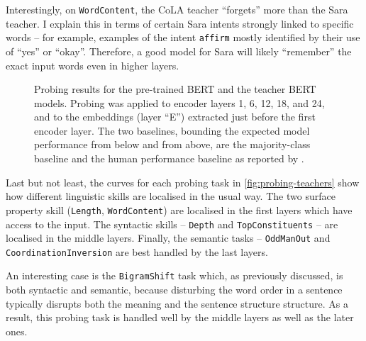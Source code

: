 \documentclass[bsc,frontabs,twoside,singlespacing,parskip,deptreport]{infthesis}
\begin{document}
{{{      Interestingly, on \verb|WordContent|, the CoLA teacher ``forgets'' more than the Sara teacher. I explain this in terms of certain Sara intents strongly linked to specific words -- for example, examples of the intent \verb|affirm| mostly identified by their use of ``yes'' or ``okay''. Therefore, a good model for Sara will likely ``remember'' the exact input words even in higher layers.

      \begin{figure}[h!tb]
        \centering
        \caption{Probing results for the pre-trained BERT and the teacher BERT models. Probing was applied to encoder layers 1, 6, 12, 18, and 24, and to the embeddings (layer ``E'') extracted just before the first encoder layer. The two baselines, bounding the expected model performance from below and from above, are the majority-class baseline and the human performance baseline as reported by \citet{Conneau_2018}.}
        \label{fig:probing-teachers}
      \end{figure}

      Last but not least, the curves for each probing task in \autoref{fig:probing-teachers} show how different linguistic skills are localised in the usual way. The two surface property skill (\verb|Length|, \verb|WordContent|) are localised in the first layers which have access to the input. The syntactic skills -- \verb|Depth| and \verb|TopConstituents| -- are localised in the middle layers. Finally, the semantic tasks -- \verb|OddManOut| and \verb|CoordinationInversion| are best handled by the last layers.
      
      An interesting case is the \verb|BigramShift| task which, as previously discussed, is both syntactic and semantic, because disturbing the word order in a sentence typically disrupts both the meaning and the sentence structure structure. As a result, this probing task is handled well by the middle layers as well as the later ones.
      
}}}
\end{document}
